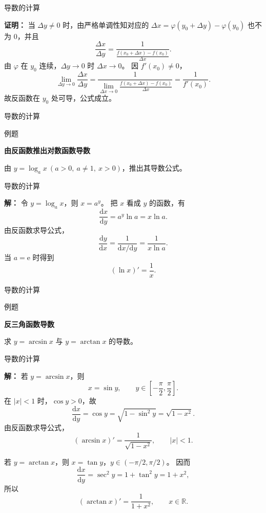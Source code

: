 \documentclass[aspectratio=169,10pt,fontset=fandol]{ctexbeamer}
\newcommand{\dd}{\mathrm{d}}
\newcommand{\ee}{\mathrm{e}}
\newcommand{\RR}{\mathbb{R}}
\begin{document}
\begin{frame}[t,fragile]{导数的计算}
\footnotesize
{\footnotesize
\textbf{证明：}
当 $\Delta y\neq0$ 时，由严格单调性知对应的 $\Delta x=\varphi(y_0+\Delta y)-\varphi(y_0)$ 也不为 $0$，并且
\[
\frac{\Delta x}{\Delta y}
=\frac{1}{\frac{f(x_0+\Delta x)-f(x_0)}{\Delta x}}.
\]
由 $\varphi$ 在 $y_0$ 连续，$\Delta y\to0$ 时 $\Delta x\to0$。 因 $f'(x_0)\neq0$，
\[
\lim_{\Delta y\to0}\frac{\Delta x}{\Delta y}
=\frac{1}{\lim_{\Delta x\to0}\frac{f(x_0+\Delta x)-f(x_0)}{\Delta x}}
=\frac1{f'(x_0)}.
\]
故反函数在 $y_0$ 处可导，公式成立。

}
\end{frame}
\begin{frame}[t,fragile]{导数的计算}
\footnotesize
\begin{block}{例题}
{\footnotesize
\textbf{由反函数推出对数函数导数}\par

由 $y=\log_a x\ (a>0,\ a\neq1,\ x>0)$，推出其导数公式。

}
\end{block}
\end{frame}
\begin{frame}[t,fragile]{导数的计算}
\footnotesize
{\footnotesize
\textbf{解：}
令 $y=\log_a x$，则 $x=a^y$。 把 $x$ 看成 $y$ 的函数，有
\[
\frac{\dd x}{\dd y}=a^y\ln a=x\ln a.
\]
由反函数求导公式，
\[
\frac{\dd y}{\dd x}
=\frac{1}{\dd x/\dd y}
=\frac{1}{x\ln a}.
\]
当 $a=\ee$ 时得到
\[
(\ln x)'=\frac1x.
\]

}
\end{frame}
\begin{frame}[t,fragile]{导数的计算}
\footnotesize
\begin{block}{例题}
{\footnotesize
\textbf{反三角函数导数}\par

求 $y=\arcsin x$ 与 $y=\arctan x$ 的导数。

}
\end{block}
\end{frame}
\begin{frame}[t,fragile]{导数的计算}
\footnotesize
{\footnotesize
\textbf{解：}
若 $y=\arcsin x$，则
\[
x=\sin y,\qquad y\in\left[-\frac{\pi}{2},\frac{\pi}{2}\right].
\]
在 $|x|<1$ 时，$\cos y>0$，故
\[
\frac{\dd x}{\dd y}=\cos y=\sqrt{1-\sin^2y}=\sqrt{1-x^2}.
\]
由反函数求导公式，
\[
(\arcsin x)'=\frac{1}{\sqrt{1-x^2}},\qquad |x|<1.
\]

若 $y=\arctan x$，则 $x=\tan y$，$y\in(-\pi/2,\pi/2)$。 因而
\[
\frac{\dd x}{\dd y}=\sec^2y=1+\tan^2y=1+x^2,
\]
所以
\[
(\arctan x)'=\frac1{1+x^2},\qquad x\in\RR.
\]

}
\end{frame}
\end{document}
